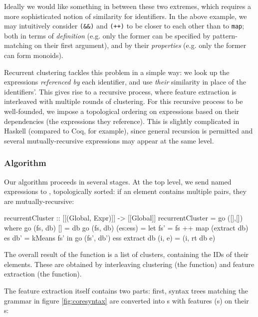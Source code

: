 Ideally we would like something in between these two extremes, which requires a more sophisticated notion of similarity for identifiers. In the above example, we may intuitively consider \texttt{(\&\&)} and \texttt{(++)} to be closer to each other than to \texttt{map}; both in terms of \emph{definition} (e.g. only the former can be specified by pattern-matching on their first argument), and by their \emph{properties} (e.g. only the former can form monoids).

Recurrent clustering tackles this problem in a simple way: we look up the expressions \emph{referenced by} each identifier, and use \emph{their} similarity in place of the identifiers'. This gives rise to a recursive process, where feature extraction is interleaved with multiple rounds of clustering. For this recursive process to be well-founded, we impose a topological ordering on expressions based on their dependencies (the expressions they reference). This is slightly complicated in Haskell (compared to Coq, for example), since general recursion is permitted and several mutually-recursive expressions may appear at the same level.

\subsubsection{Algorithm}
\label{sec:algorithm}

Our algorithm proceeds in several stages. At the top level, we send named expressions to , topologically sorted: if an element contains multiple  pairs, they are mutually-recursive:

\begin{haskell}
recurrentCluster :: [[(Global, Expr)]] -> [[Global]]
recurrentCluster = go ([],[])
  where go (fs, db) []       = db
        go (fs, db) (es:ess) = let fs' = fs ++ map (extract db) es
                                   db' = kMeans fs'
                                in go (fs', db') ess
        extract db (i, e) = (i, rt db e)
\end{haskell}

The overall result of the  function is a list of clusters, containing the IDs of their elements. These are obtained by interleaving clustering (the  function) and feature extraction (the  function).

The feature extraction itself contains two parts: first, syntax trees matching the grammar in figure \ref{fig:coresyntax} are converted into s with features (s) on their s:

